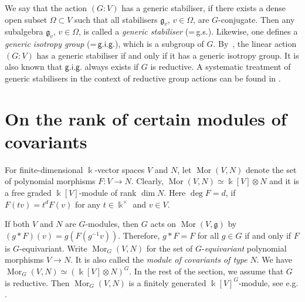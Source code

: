 We say that the action $(G{:}V)$ {has a generic stabiliser}, if there exists
a dense open subset $\Omega\subset V$ such that all stabilisers ${{\mathfrak g}}_v$, $v\in \Omega$, are 
$G$-conjugate. Then any subalgebra ${{\mathfrak g}}_v$, $v\in\Omega$, is called a {\it generic stabiliser}
(=\,\textsf{g.s.}).
Likewise, one defines  a {\it generic isotropy group} (=\,${\mathsf{g.i.g.}}$), 
which is a subgroup of $G$. By~\cite[\S\,4]{Ri}, the linear action $(G:V)$ has a generic stabiliser if and only if it has a generic isotropy group. It is also known that ${\mathsf{g.i.g.}}$ always exists if $G$ is reductive.
A systematic treatment of generic stabilisers in the context of reductive group
actions can be found in \cite[\S 7]{VP}.

\section{On the rank of certain modules of covariants}
\label{sect:rank}

\noindent
For finite-dimensional ${\Bbbk}$-vector spaces $V$ and $N$, let ${\operatorname{Mor}}(V,N)$ denote the set of 
polynomial morphisms $F: V\to N$. Clearly, ${\operatorname{Mor}}(V,N)\simeq {\Bbbk}[V]\otimes N$ and it is a free graded 
${\Bbbk}[V]$-module of rank $\dim N$. Here $\deg F=d$, if $F(tv)=t^dF(v)$ for any $t\in {\Bbbk}^\times$ and 
$v\in V$.

If both $V$ and $N$ are $G$-modules, then $G$ acts on ${\operatorname{Mor}}(V,{{\mathfrak g}})$ by $(g\ast F)(v)=g(F(g^{-1}v))$. 
Therefore, $g\ast F=F$ for all $g\in G$ if and only 
if $F$ is $G$-equivariant. Write ${\operatorname{Mor}}_G(V,N)$ for the set
of $G$-{\it equivariant} polynomial morphisms $V\to N$. It is also called the 
{\it module of covariants of type\/} $N$. We have 
${\operatorname{Mor}}_G(V,N)\simeq ({\Bbbk}[V]\otimes N)^G$. In the rest of the section, we assume that $G$ is reductive. 
Then ${\operatorname{Mor}}_G(V,N)$ is a finitely generated ${\Bbbk}[V]^G$-module, see e.g. \cite[3.12]{VP}.

